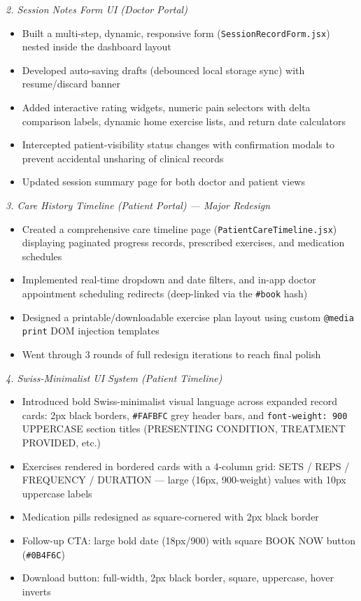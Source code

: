 \documentclass[11pt,a4paper]{article}
\begin{document}
\textit{2. Session Notes Form UI (Doctor Portal)}
\begin{itemize}
  \item Built a multi-step, dynamic, responsive form (\texttt{SessionRecordForm.jsx}) nested
        inside the dashboard layout
  \item Developed auto-saving drafts (debounced local storage sync) with resume/discard banner
  \item Added interactive rating widgets, numeric pain selectors with delta comparison labels,
        dynamic home exercise lists, and return date calculators
  \item Intercepted patient-visibility status changes with confirmation modals to prevent
        accidental unsharing of clinical records
  \item Updated session summary page for both doctor and patient views
\end{itemize}

\textit{3. Care History Timeline (Patient Portal) — Major Redesign}
\begin{itemize}
  \item Created a comprehensive care timeline page (\texttt{PatientCareTimeline.jsx}) displaying
        paginated progress records, prescribed exercises, and medication schedules
  \item Implemented real-time dropdown and date filters, and in-app doctor appointment
        scheduling redirects (deep-linked via the \texttt{\#book} hash)
  \item Designed a printable/downloadable exercise plan layout using custom
        \texttt{@media print} DOM injection templates
  \item Went through 3 rounds of full redesign iterations to reach final polish
\end{itemize}

\textit{4. Swiss-Minimalist UI System (Patient Timeline)}
\begin{itemize}
  \item Introduced bold Swiss-minimalist visual language across expanded record cards:
        2px black borders, \texttt{\#FAFBFC} grey header bars, and \texttt{font-weight: 900}
        UPPERCASE section titles (PRESENTING CONDITION, TREATMENT PROVIDED, etc.)
  \item Exercises rendered in bordered cards with a 4-column grid:
        SETS / REPS / FREQUENCY / DURATION — large (16px, 900-weight) values with 10px
        uppercase labels
  \item Medication pills redesigned as square-cornered with 2px black border
  \item Follow-up CTA: large bold date (18px/900) with square BOOK NOW button
        (\texttt{\#0B4F6C})
  \item Download button: full-width, 2px black border, square, uppercase, hover inverts
\end{itemize}
\end{document}

